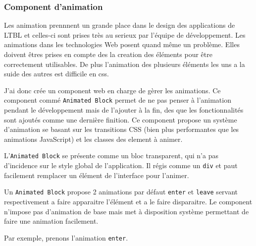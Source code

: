 \subsubsection{Component d'animation}

Les animation prennnent un grande place dans le design des applications de LTBL et celles-ci sont prises très au serieux par l'équipe de développement.
Les animations dans les technologies Web posent quand même un problème.
Elles doivent êtres prises en compte des la creation des éléments pour être correctement utilisables.
De plus l'animation des plusieurs éléments les uns a la suide des autres est difficile en css.

J'ai donc crée un component web en charge de gèrer les animations.
Ce component commé \texttt{Animated Block} permet de ne pas penser à l'animation pendant le développement mais de l'ajouter à la fin, des que les fonctionnalités sont ajoutés comme une dernière finition.
Ce component propose un système d'animation se basant sur les transitions CSS (bien plus performantes que les animations JavaScript) et les classes des element à animer.

L'\texttt{Animated Block} se présente comme un bloc transparent, qui n'a pas d'incidence sur le style global de l'application.
Il régis comme un \texttt{div} et paut facilement remplacer un élément de l'interface pour l'animer.

Un \texttt{Animated Block} propose 2 animations par défaut \texttt{enter} et \texttt{leave} servant respectivement a faire apparaitre l'élément et a le faire disparaitre.
Le component n'impose pas d'animation de base mais met à disposition système permettant de faire une animation facilement.

Par exemple, prenons l'animation \texttt{enter}.

